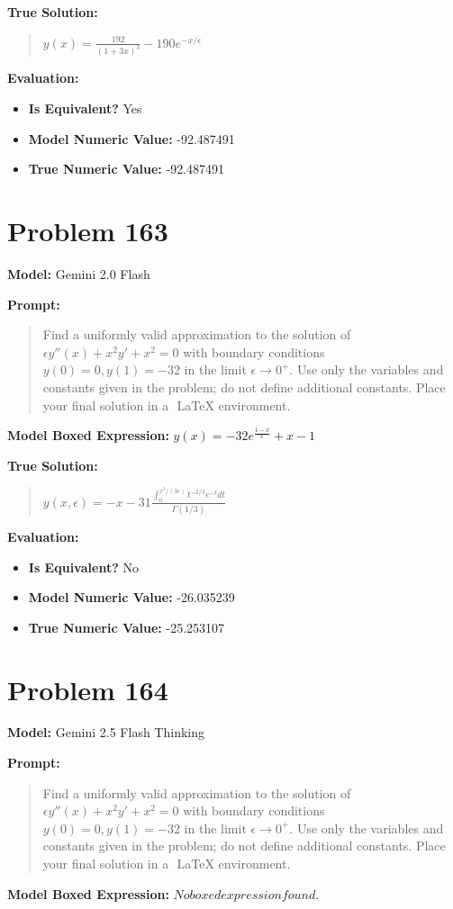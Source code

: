 \documentclass{article}
\begin{document}
{\textbf{True Solution:}
\begin{quote}
$y(x) = \frac{192}{(1+3x)^3} - 190 e^{-x/ \epsilon}$
\end{quote}

\textbf{Evaluation:}
\begin{itemize}
\item \textbf{Is Equivalent?} Yes
\item \textbf{Model Numeric Value:} -92.487491
\item \textbf{True Numeric Value:} -92.487491
\end{itemize}
\vspace{1cm}
\section*{Problem 163}
\textbf{Model:} Gemini 2.0 Flash

\textbf{Prompt:}
\begin{quote}
Find a uniformly valid approximation to the solution of $\epsilon y''(x) + x^2y' + x^2 = 0$ with boundary conditions $y(0) = 0, y(1) = -32$ in the limit $\epsilon \to 0^+$. Use only the variables and constants given in the problem; do not define additional constants. Place your final solution in a $\boxed{}$ LaTeX environment.
\end{quote}
\textbf{Model Boxed Expression:} $y(x) = -32e^{\frac{1-x}{\epsilon}} + x - 1$

\textbf{True Solution:}
\begin{quote}
$y(x,\epsilon) = -x - 31 \frac{\int_0^{x^3/(3\epsilon)} t^{-2/3} e^{-t} dt}{\Gamma(1/3)}$
\end{quote}

\textbf{Evaluation:}
\begin{itemize}
\item \textbf{Is Equivalent?} No
\item \textbf{Model Numeric Value:} -26.035239
\item \textbf{True Numeric Value:} -25.253107
\end{itemize}
\vspace{1cm}
\section*{Problem 164}
\textbf{Model:} Gemini 2.5 Flash Thinking

\textbf{Prompt:}
\begin{quote}
Find a uniformly valid approximation to the solution of $\epsilon y''(x) + x^2y' + x^2 = 0$ with boundary conditions $y(0) = 0, y(1) = -32$ in the limit $\epsilon \to 0^+$. Use only the variables and constants given in the problem; do not define additional constants. Place your final solution in a $\boxed{}$ LaTeX environment.
\end{quote}
\textbf{Model Boxed Expression:} $No boxed expression found.$

}
\end{document}
